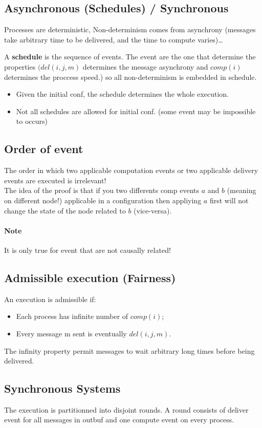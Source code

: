 \subsection{Asynchronous (Schedules) / Synchronous}
Processes are deterministic,
Non-determinism comes from asynchrony (messages take arbitrary time to
be delivered, and the time to compute varies)\ldots \newline

A \textbf{schedule} is the sequence of events. The event are the
one that determine the properties $(del(i,j,m)$ determines the message
asynchrony and $comp(i)$ determines the proccess speed.)
 so all non-determinism is embedded in schedule.

\begin{itemize}
	 \item Given the initial conf, the schedule determines the whole
	 execution.
	 \item Not all schedules are allowed for initial conf. (some
	 event may be impossible to occurs)
\end{itemize}

\subsection{Order of event}
The order in which two applicable computation events or
two applicable delivery events are executed is irrelevant!\\
The idea of the proof is that if you two differents comp
events $a$ and $b$ (meaning on different node!) applicable in a
configuration then appliying $a$ first will not change the state of the
node related to $b$ (vice-versa).
\paragraph{Note} It is only true for event that are not causally
related!
\subsection{Admissible execution (Fairness)}
An execution is admissible if:
\begin{itemize}
	\item Each process has infinite number of $comp(i)$;
	\item Every message m sent is eventually $del(i,j,m)$.
\end{itemize}
The infinity property permit messages to wait arbitrary long times before
being delivered.
\subsection{Synchronous Systems}
The execution is partitionned into disjoint rounds. A round consists of
deliver event for all messages in outbuf and one compute event on
every process.

